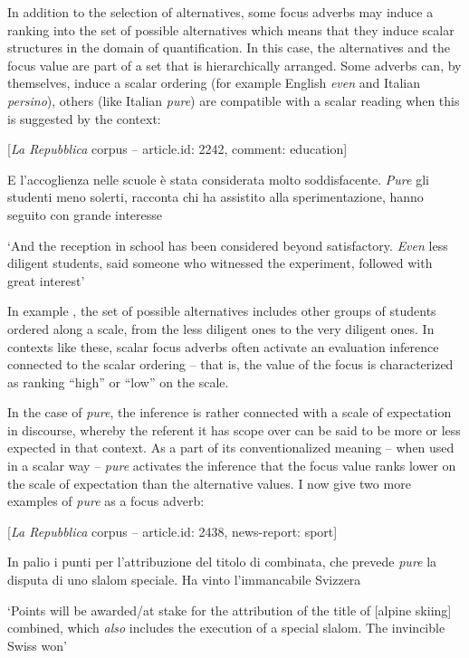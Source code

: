 In addition to the selection of alternatives, some focus adverbs may induce a ranking into the set of possible alternatives which means that they induce scalar structures in the domain of quantification. In this case, the alternatives and the focus value are part of a set that is hierarchically arranged. Some adverbs can, by themselves, induce a scalar ordering (for example English \textit{even} and Italian \textit{persino}), others (like Italian \textit{pure}) are compatible with a scalar reading when this is suggested by the context:

\ea%
    \label{ex:key:14}

          [\textit{La Repubblica} corpus – article.id: 2242, comment: education]

E l’accoglienza nelle scuole è stata considerata molto soddisfacente. \textit{Pure} gli studenti meno solerti, racconta chi ha assistito alla sperimentazione, hanno seguito con grande interesse

\newpage
\glt ‘And the reception in school has been considered beyond satisfactory. \textit{Even} less diligent students, said someone who witnessed the experiment, followed with great interest’
\z

In example , the set of possible alternatives includes other groups of students ordered along a scale, from the less diligent ones to the very diligent ones. In contexts like these, scalar focus adverbs often activate an evaluation inference connected to the scalar ordering – that is, the value of the focus is characterized as ranking “high” or “low” on the scale.

In the case of \textit{pure}, the inference is rather connected with a scale of expectation in discourse, whereby the referent it has scope over can be said to be more or less expected in that context. As a part of its conventionalized meaning – when used in a scalar way – \textit{pure} activates the inference that the focus value ranks lower on the scale of expectation than the alternative values. I now give two more examples of \textit{pure} as a focus adverb:

\ea%
    \label{ex:key:15}

          [\textit{La Repubblica} corpus – article.id: 2438, news-report: sport]

In palio i punti per l’attribuzione del titolo di combinata, che prevede \textit{pure} la disputa di uno slalom speciale. Ha vinto l’immancabile Svizzera

\glt ‘Points will be awarded/at stake for the attribution of the title of [alpine skiing] combined, which \textit{also} includes the execution of a special slalom. The invincible Swiss won’
    \z

